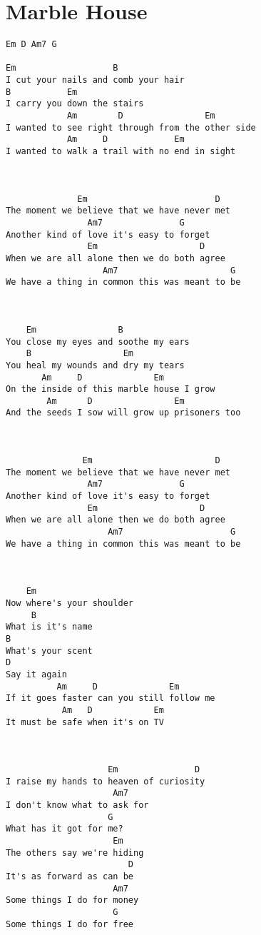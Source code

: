 \documentclass[leqno]{memoir}
\begin{document}
\chapter{Marble House}
\begin{verbatim}
Em D Am7 G

Em                   B
I cut your nails and comb your hair
B           Em
I carry you down the stairs
            Am        D                Em
I wanted to see right through from the other side
            Am     D             Em
I wanted to walk a trail with no end in sight



              Em                         D
The moment we believe that we have never met
                Am7               G
Another kind of love it's easy to forget
                Em                    D
When we are all alone then we do both agree
                   Am7                      G
We have a thing in common this was meant to be 



    Em                B
You close my eyes and soothe my ears
    B                  Em
You heal my wounds and dry my tears
       Am     D              Em
On the inside of this marble house I grow
        Am      D                Em
And the seeds I sow will grow up prisoners too



               Em                        D
The moment we believe that we have never met
                Am7               G
Another kind of love it's easy to forget
                Em                    D
When we are all alone then we do both agree
                    Am7                     G
We have a thing in common this was meant to be



    Em
Now where's your shoulder
     B
What is it's name
B
What's your scent
D
Say it again
          Am     D              Em              
If it goes faster can you still follow me
           Am   D            Em
It must be safe when it's on TV



                    Em               D
I raise my hands to heaven of curiosity
                     Am7
I don't know what to ask for
                    G
What has it got for me?
                     Em
The others say we're hiding
                        D
It's as forward as can be
                     Am7
Some things I do for money
                     G
Some things I do for free 
\end{verbatim}
\newpage
\end{document}
